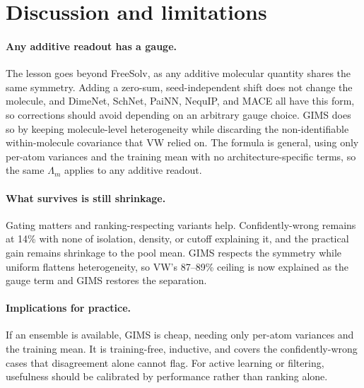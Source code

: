 \documentclass{article}
\begin{document}
\section{Discussion and limitations}

\paragraph{Any additive readout has a gauge.} The lesson goes beyond FreeSolv, as any additive molecular quantity shares
the same symmetry. Adding a zero-sum, seed-independent shift does not change
the molecule, and DimeNet, SchNet, PaiNN, NequIP, and MACE all have this form,
so corrections should avoid depending on an arbitrary gauge choice. GIMS does
so by keeping molecule-level heterogeneity while discarding the non-identifiable
within-molecule covariance that VW relied on. The formula is general, using
only per-atom variances and the training mean with no architecture-specific
terms, so the same $\Lambda_m$ applies to any additive readout.
\paragraph{What survives is still shrinkage.} Gating matters and
ranking-respecting variants help. Confidently-wrong remains at 14\% with none
of isolation, density, or cutoff explaining it, and the practical gain remains
shrinkage to the pool mean. GIMS respects the symmetry while uniform flattens
heterogeneity, so VW's 87--89\% ceiling is now explained as the gauge term and
GIMS restores the separation.

\paragraph{Implications for practice.} If an ensemble is available, GIMS is
cheap, needing only per-atom variances and the training mean. It is
training-free, inductive, and covers the confidently-wrong cases that
disagreement alone cannot flag. For active learning or filtering, usefulness
should be calibrated by performance rather than ranking alone.
\end{document}
